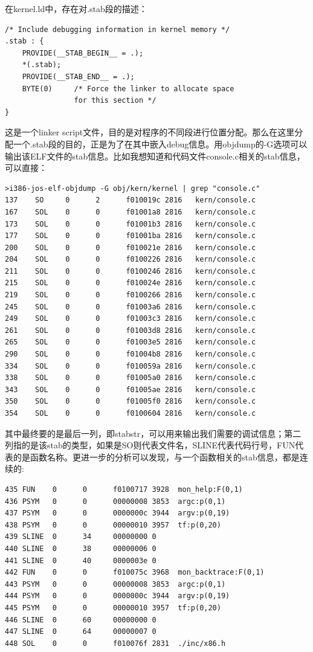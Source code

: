 在kernel.ld中，存在对.stab段的描述：
\begin{lstlisting}
/* Include debugging information in kernel memory */
.stab : {
    PROVIDE(__STAB_BEGIN__ = .);
    *(.stab);
    PROVIDE(__STAB_END__ = .);
    BYTE(0)     /* Force the linker to allocate space
                for this section */
}
\end{lstlisting}
这是一个linker script文件，目的是对程序的不同段进行位置分配。那么在这里分配一个.stab段的目的，正是为了在其中嵌入debug信息。用objdump的-G选项可以输出该ELF文件的stab信息。比如我想知道和代码文件console.c相关的stab信息，可以直接：\\
\begin{lstlisting}
>i386-jos-elf-objdump -G obj/kern/kernel | grep "console.c"                                                                         
137    SO     0      2      f010019c 2816   kern/console.c
167    SOL    0      0      f01001a8 2816   kern/console.c
173    SOL    0      0      f01001b3 2816   kern/console.c
177    SOL    0      0      f01001ba 2816   kern/console.c
200    SOL    0      0      f010021e 2816   kern/console.c
204    SOL    0      0      f0100226 2816   kern/console.c
211    SOL    0      0      f0100246 2816   kern/console.c
215    SOL    0      0      f010024e 2816   kern/console.c
219    SOL    0      0      f0100266 2816   kern/console.c
245    SOL    0      0      f01003a6 2816   kern/console.c
249    SOL    0      0      f01003c3 2816   kern/console.c
261    SOL    0      0      f01003d8 2816   kern/console.c
265    SOL    0      0      f01003e5 2816   kern/console.c
290    SOL    0      0      f01004b8 2816   kern/console.c
334    SOL    0      0      f010059a 2816   kern/console.c
338    SOL    0      0      f01005a0 2816   kern/console.c
343    SOL    0      0      f01005ae 2816   kern/console.c
350    SOL    0      0      f01005f0 2816   kern/console.c
354    SOL    0      0      f0100604 2816   kern/console.c
\end{lstlisting}

其中最终要的是最后一列，即stabstr，可以用来输出我们需要的调试信息；第二列指的是该stab的类型，如果是SO则代表文件名，SLINE代表代码行号，FUN代表的是函数名称。更进一步的分析可以发现，与一个函数相关的stab信息，都是连续的:\\

\begin{lstlisting}
435 FUN    0      0      f0100717 3928  mon_help:F(0,1)
436 PSYM   0      0      00000008 3853  argc:p(0,1)
437 PSYM   0      0      0000000c 3944  argv:p(0,19)
438 PSYM   0      0      00000010 3957  tf:p(0,20)
439 SLINE  0      34     00000000 0      
440 SLINE  0      38     00000006 0      
441 SLINE  0      40     0000003e 0      
442 FUN    0      0      f010075c 3968  mon_backtrace:F(0,1)
443 PSYM   0      0      00000008 3853  argc:p(0,1)
444 PSYM   0      0      0000000c 3944  argv:p(0,19)
445 PSYM   0      0      00000010 3957  tf:p(0,20)
446 SLINE  0      60     00000000 0      
447 SLINE  0      64     00000007 0      
448 SOL    0      0      f010076f 2831  ./inc/x86.h
\end{lstlisting}

